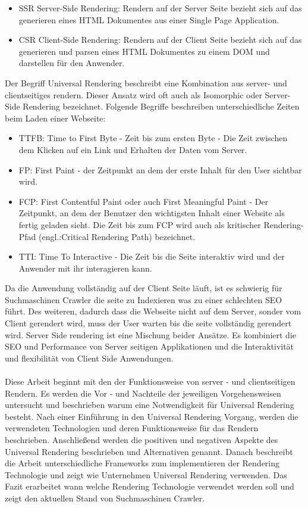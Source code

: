 \documentclass[runningheads]{llncs}
\begin{document}
\begin{itemize}
  \setlength\itemsep{1em}
  \item SSR Server-Side Rendering: Rendern auf der Server Seite bezieht sich auf das generieren eines HTML Dokumentes 
  aus einer Single Page Application. 
  \item CSR Client-Side Rendering: Rendern auf der Client Seite bezieht sich auf das generieren und parsen eines 
  HTML Dokumentes zu einem DOM und darstellen für den Anwender. 
\end{itemize}
Der Begriff Universal Rendering beschreibt eine Kombination aus server- und clientseitiges rendern. 
Dieser Ansatz wird oft auch als Isomorphic oder Server-Side Rendering bezeichnet.
Folgende Begriffe beschreiben unterschiedliche Zeiten beim Laden einer Webseite:
\begin{itemize}
  \setlength\itemsep{1em}
  \item TTFB: Time to First Byte - Zeit bis zum ersten Byte -  Die Zeit zwischen dem Klicken auf ein Link und Erhalten der Daten vom Server.
  \item FP: First Paint - der Zeitpunkt an dem der erste Inhalt für den User sichtbar wird.
  \item FCP: First Contentful Paint oder auch First Meaningful Paint - Der Zeitpunkt, an dem der Benutzer den wichtigsten Inhalt einer Website als fertig geladen sieht. Die Zeit bis zum FCP wird auch als kritischer Rendering-Pfad (engl.:Critical Rendering Path) bezeichnet.
  \item TTI: Time To Interactive - Die Zeit bis die Seite interaktiv wird und der Anwender mit ihr interagieren kann.
\end{itemize}
Da die Anwendung vollständig auf der Client Seite läuft, ist es schwierig für Suchmaschinen Crawler die seite zu Indexieren was zu einer schlechten SEO führt.
Des weiteren, dadurch dass die Webseite nicht auf dem Server, sonder vom Client gerendert wird, muss der User warten bis die seite vollständig gerendert wird.
Server Side rendering ist eine Mischung beider Ansätze. Es kombiniert die SEO und Performance von Server seitigen Applikationen und die Interaktivität und flexibilität von Client Side Anwendungen.
\\
\\
Diese Arbeit beginnt mit den der Funktionsweise von server - und clientseitigen Rendern. 
Es werden die Vor - und Nachteile der jeweiligen Vorgehensweisen untersucht 
und beschrieben warum eine Notwendigkeit für Universal Rendering besteht. Nach einer Einführung in den Universal Rendering Vorgang, werden die verwendeten Technologien und deren Funktionsweise für das Rendern beschrieben. Anschließend werden die positiven und negativen Aspekte des Universal Rendering beschrieben und Alternativen genannt. Danach beschreibt die Arbeit unterschiedliche Frameworks zum implementieren der Rendering Technologie und zeigt wie Unternehmen Universal Rendering verwenden. Das Fazit erarbeitet wann welche Rendering Technologie verwendet werden soll und zeigt den aktuellen Stand von Suchmaschinen Crawler.
\newpage
\end{document}
